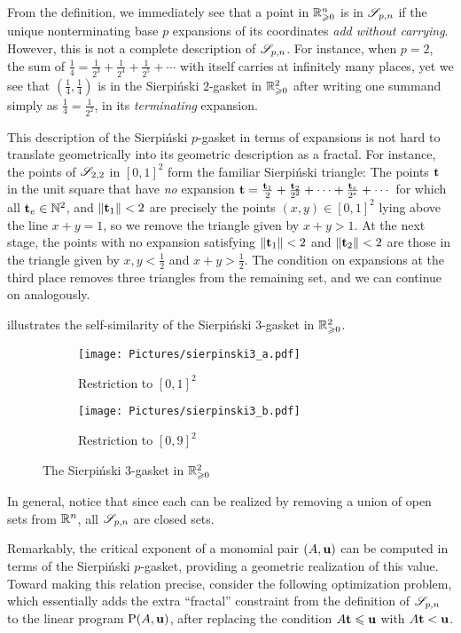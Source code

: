 \documentclass[11pt]{amsart}
\begin{document}
From the definition, we immediately see that a point in $\mathbb{R}_{\geqslant 0}^n$ is in $\mathscr{S}_{p,n}$ if the unique nonterminating base $p$ expansions of its coordinates \emph{add without carrying}.
However, this is not a complete description of $\mathscr{S}_{p,n}$.
For instance, when $p=2$, the sum of $\frac{1}{4} = \frac{1}{2^3} + \frac{1}{2^4} + \frac{1}{2^5} + \cdots$ with itself carries at infinitely many places, yet we see that $\left(\frac{1}{4}, \frac{1}{4}\right)$ is in the Sierpi\'nski $2$-gasket in $\mathbb{R}_{\geqslant 0}^2$ after writing one summand simply as $\frac{1}{4} = \frac{1}{2^2}$, \ie in its \emph{terminating} expansion.

This description of the Sierpi\'nski $p$-gasket in terms of expansions is not hard to translate geometrically into its geometric description as a fractal.
For instance, the points of $\mathscr{S}_{2,2}$ in $[0,1]^2$ form the familiar Sierpi\'nski triangle:
The points $\mathbf{t}$ in the unit square that have \emph{no} expansion $\mathbf{t} = \frac{\mathbf{t}_1}{2} +\frac{\mathbf{t}_2}{2^2}+\cdots +\frac{\mathbf{t}_e}{2^e} + \cdots$ for which all $\mathbf{t}_e \in \mathbb{N}^2$, and $\| \mathbf{t}_1 \| < 2$ are precisely the points $(x,y) \in [0,1]^2$ lying above the line $x+y=1$, so we remove the triangle given by $x+y>1$.
At the next stage, the points with no expansion satisfying $\| \mathbf{t}_1 \| < 2$ and  $\| \mathbf{t}_2 \| < 2$ are those in the triangle given by $x, y < \frac{1}{2}$ and $x+y > \frac{1}{2}$.
The condition on expansions at the third place removes three triangles from the remaining set, and we can continue on analogously.

 illustrates the self-similarity of the Sierpi\'nski $3$-gasket in $\mathbb{R}_{\geqslant 0}^2$.
\begin{figure}
\begin{subfigure}{.49\textwidth}
  \centering
  \texttt{[image: Pictures/sierpinski3\_a.pdf]}
  \caption{Restriction to $[0,1]^2$}
\end{subfigure}
\begin{subfigure}{.49\textwidth}
  \centering
  \texttt{[image: Pictures/sierpinski3\_b.pdf]}
  \caption{Restriction to $[0,9]^2$}
\end{subfigure}
\caption{The Sierpi\'nski 3-gasket in $\mathbb{R}_{\geqslant 0}^2$}
\label{fig: sierpinski 3-gasket}
\end{figure}
In general, notice that since each can be realized by removing a union of open sets from $\mathbb{R}^n$, all $\mathscr{S}_{p,n}$ are closed sets.

Remarkably, the critical exponent of a monomial pair $(A, \mathbf{u})$ can be computed in terms of the Sierpi\'nski $p$-gasket, providing a geometric realization of this value.
Toward making this relation precise, consider the following optimization problem, which essentially adds the extra ``fractal'' constraint from the definition of $\mathscr{S}_{p,n}$ to
the linear program $\mathrm{P}(A, \mathbf{u})$, after replacing the condition $A \mathbf{t} \leqslant \mathbf{u}$ with $A \mathbf{t} < \mathbf{u}$.
\end{document}

